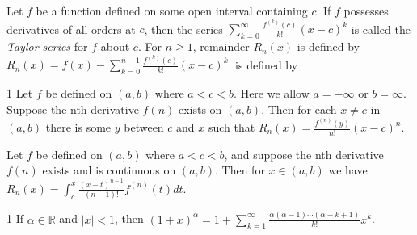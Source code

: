 \begin{defn}{1}
	Let $f$ be a function defined on some open interval containing $c$. If $f$	possesses derivatives of all orders at $c$, then the series $\sum_{k=0}^{\infty} \frac{f^(k)(c)}{k!}(x-c)^k$ is called the \textit{Taylor series} for $f$ about $c$. For $n \geq 1$, remainder $R_n (x)$ is defined by $R_n(x) = f(x) - \sum_{k=0}^{n-1} \frac{f^(k)(c)}{k!}(x-c)^k$.
	is defined by
\end{defn}

\begin{theo}{1}
	Let $f$ be defined on $(a, b)$ where $a < c < b$. Here we allow $a = -\infty$ or $b = \infty$. Suppose the nth derivative $f(n)$ exists on $(a, b)$. Then for each $x \neq c$ in $(a, b)$ there is some $y$ between $c$ and $x$ such that $R_n(x) = \frac{f^(n)(y)}{n!}(x-c)^n$.
\end{theo}

\begin{theo}{1}
	Let $f$ be defined on $(a, b)$ where $a < c < b$, and suppose the nth
	derivative $f(n)$ exists and is continuous on $(a, b)$. Then for $x \in (a, b)$ we have $R_n(x) = \int_{c}^{x} \frac{(x-t)^{n-1}}{(n-1)!}f^{(n)}(t) dt$.
\end{theo}

\begin{theo}{1}
	If $\alpha \in \mathbb{R}$ and $|x| < 1$, then $(1+x)^\alpha = 1+\sum_{k=1}^{\infty} \frac{\alpha(\alpha-1)\cdots(\alpha-k+1)}{k!}x^k$.
\end{theo}
	

